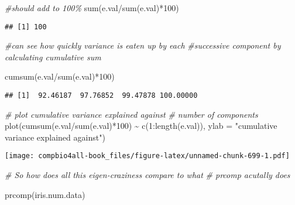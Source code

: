 \documentclass[
]{book}
\newenvironment{Shaded}{\begin{snugshade}}{\end{snugshade}}
\newcommand{\AttributeTok}[1]{\textcolor[rgb]{0.77,0.63,0.00}{#1}}
\newcommand{\CommentTok}[1]{\textcolor[rgb]{0.56,0.35,0.01}{\textit{#1}}}
\newcommand{\DecValTok}[1]{\textcolor[rgb]{0.00,0.00,0.81}{#1}}
\newcommand{\FunctionTok}[1]{\textcolor[rgb]{0.00,0.00,0.00}{#1}}
\newcommand{\NormalTok}[1]{#1}
\newcommand{\SpecialCharTok}[1]{\textcolor[rgb]{0.00,0.00,0.00}{#1}}
\newcommand{\StringTok}[1]{\textcolor[rgb]{0.31,0.60,0.02}{#1}}
\begin{document}
\begin{Shaded}
\begin{Highlighting}[]
\CommentTok{\#should add to 100\%}
\FunctionTok{sum}\NormalTok{(e.val}\SpecialCharTok{/}\FunctionTok{sum}\NormalTok{(e.val)}\SpecialCharTok{*}\DecValTok{100}\NormalTok{)}
\end{Highlighting}
\end{Shaded}

\begin{verbatim}
## [1] 100
\end{verbatim}

\begin{Shaded}
\begin{Highlighting}[]
\CommentTok{\#can see how quickly variance is eaten up by each}
\CommentTok{\#successive component by calculating cumulative sum}

\FunctionTok{cumsum}\NormalTok{(e.val}\SpecialCharTok{/}\FunctionTok{sum}\NormalTok{(e.val)}\SpecialCharTok{*}\DecValTok{100}\NormalTok{)}
\end{Highlighting}
\end{Shaded}

\begin{verbatim}
## [1]  92.46187  97.76852  99.47878 100.00000
\end{verbatim}

\begin{Shaded}
\begin{Highlighting}[]
\CommentTok{\# plot cumulative variance explained against}
\CommentTok{\# number of components}
\FunctionTok{plot}\NormalTok{(}\FunctionTok{cumsum}\NormalTok{(e.val}\SpecialCharTok{/}\FunctionTok{sum}\NormalTok{(e.val)}\SpecialCharTok{*}\DecValTok{100}\NormalTok{) }\SpecialCharTok{\textasciitilde{}}
     \FunctionTok{c}\NormalTok{(}\DecValTok{1}\SpecialCharTok{:}\FunctionTok{length}\NormalTok{(e.val)),}
     \AttributeTok{ylab =} \StringTok{"cumulative variance explained against"}\NormalTok{)}
\end{Highlighting}
\end{Shaded}

\texttt{[image: compbio4all-book\_files/figure-latex/unnamed-chunk-699-1.pdf]}

\begin{Shaded}
\begin{Highlighting}[]
\CommentTok{\# So how does all this eigen{-}craziness compare to what}
\CommentTok{\# prcomp acutally does}

\FunctionTok{prcomp}\NormalTok{(iris.num.data)}
\end{Highlighting}
\end{Shaded}
\end{document}
